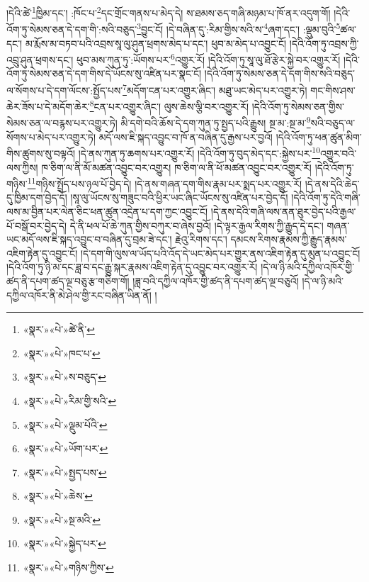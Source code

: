 །དེའི་ཚེ་\footnote{«སྣར་»«པེ་»ཚེ་ནི་}ཁྱིམ་དང་། :ཁོང་པ་\footnote{«སྣར་»«པེ་»ཁང་པ་}དང་གྲོང་གནས་པ་མེད་དེ། ས་ཐམས་ཅད་གཞི་མཉམ་པ་ཁོ་ནར་འདུག་གོ། །དེའི་འོག་ཏུ་སེམས་ཅན་དེ་དག་གི་:སའི་བཅུད་\footnote{«སྣར་»«པེ་»ས་བཅུད་}བྱུང་ངོ། །དེ་བཞིན་དུ་:རིམ་གྱིས་སའི་ས་\footnote{«སྣར་»«པེ་»རིམ་གྱི་སའི་}ཞག་དང་། :ལྡུམ་བུའི་\footnote{«སྣར་»«པེ་»ལྡུམ་པོའི་}ཚལ་དང་། མ་རྨོས་མ་བཏབ་པའི་འབྲས་སཱ་ལུ་ཤུན་ཕྲགས་མེད་པ་དང་། ཕུབ་མ་མེད་པ་འབྱུང་ངོ། །དེའི་འོག་ཏུ་འབྲས་ཀྱི་འབྲུ་ཤུན་ཕྲགས་དང་། ཕུབ་མས་ཀུན་ཏུ་:ཡོགས་པར་\footnote{«སྣར་»«པེ་»ཡོག་པར་}འགྱུར་རོ། །དེའི་འོག་ཏུ་སཱ་ལུ་ཐོ་རྩེར་སྐྱེ་བར་འགྱུར་རོ། །དེའི་འོག་ཏུ་སེམས་ཅན་དེ་དག་གིས་དེ་ཡོངས་སུ་འཛིན་པར་སྣང་ངོ། །དེའི་འོག་ཏུ་སེམས་ཅན་དེ་དག་གིས་སའི་བཅུད་ལ་སོགས་པ་དེ་དག་ལོངས་:སྤྱོད་པས་\footnote{«སྣར་»«པེ་»སྤྱད་པས་}མདོག་ངན་པར་འགྱུར་ཞིང་། མཐུ་ཡང་མེད་པར་འགྱུར་ཏེ། གང་གིས་ཤས་ཆེར་ཟོས་པ་དེ་མདོག་ཆེར་\footnote{«སྣར་»«པེ་»ཆེས་}ངན་པར་འགྱུར་ཞིང་། ལུས་ཆེས་ལྕི་བར་འགྱུར་རོ། །དེའི་འོག་ཏུ་སེམས་ཅན་གྱིས་སེམས་ཅན་ལ་བརྙས་པར་འགྱུར་ཏེ། མི་དགེ་བའི་ཆོས་དེ་དག་ཀུན་ཏུ་སྤྱད་པའི་རྒྱུས། སྔ་མ་:སྔ་མ་\footnote{«སྣར་»«པེ་»སྔ་མའི་}སའི་བཅུད་ལ་སོགས་པ་མེད་པར་འགྱུར་ཏེ། མདོ་ལས་ཇི་སྐད་འབྱུང་བ་ཁོ་ན་བཞིན་དུ་རྒྱས་པར་བྱའོ། །དེའི་འོག་ཏུ་ཕན་ཚུན་མིག་གིས་ཚུགས་སུ་བལྟའོ། །དེ་ནས་ཀུན་ཏུ་ཆགས་པར་འགྱུར་རོ། །དེའི་འོག་ཏུ་བུད་མེད་དང་:སྐྱེས་པར་\footnote{«སྣར་»«པེ་»སྐྱེད་པར་}འགྱུར་བའི་ལས་ཀྱིས། ཁ་ཅིག་ལ་ནི་མོ་མཚན་འབྱུང་བར་འགྱུར། ཁ་ཅིག་ལ་ནི་ཕོ་མཚན་འབྱུང་བར་འགྱུར་རོ། །དེའི་འོག་ཏུ་གཉིས་\footnote{«སྣར་»«པེ་»གཉིས་ཀྱིས་}གཉིས་སྤྲོད་པས་ཉལ་པོ་བྱེད་དེ། །དེ་ནས་གཞན་དག་གིས་རྣམ་པར་སྨད་པར་འགྱུར་རོ། །དེ་ནས་དེའི་ཆེད་དུ་ཁྱིམ་དག་བྱེད་དོ། །སཱ་ལུ་ཡོངས་སུ་གཟུང་བའི་ཕྱིར་ཡང་ཞིང་ཡོངས་སུ་འཛིན་པར་བྱེད་དོ། །དེའི་འོག་ཏུ་དེའི་གཞི་ལས་མ་བྱིན་པར་ལེན་ཅིང་ཕན་ཚུན་འདྲེན་པ་དག་ཀྱང་འབྱུང་ངོ། །དེ་ནས་དེའི་གཞི་ལས་ནན་ཐུར་བྱེད་པའི་རྒྱལ་པོ་བསྒོ་བར་བྱེད་དེ། དེ་ནི་ཕལ་པོ་ཆེ་ཀུན་གྱིས་བཀུར་བ་ཞེས་བྱའོ། །དེ་ལྟར་རྒྱལ་རིགས་ཀྱི་རྒྱུད་དེ་དང་། གཞན་ཡང་མདོ་ལས་ཇི་སྐད་འབྱུང་བ་བཞིན་དུ་བྲམ་ཟེ་དང་། རྗེའུ་རིགས་དང་། དམངས་རིགས་རྣམས་ཀྱི་རྒྱུད་རྣམས་འཇིག་རྟེན་དུ་འབྱུང་ངོ། །དེ་དག་གི་ལུས་ལ་ཡོད་པའི་འོད་དེ་ཡང་མེད་པར་གྱུར་ནས་འཇིག་རྟེན་དུ་མུན་པ་འབྱུང་ངོ། །དེའི་འོག་ཏུ་ཉི་མ་དང་ཟླ་བ་དང་རྒྱུ་སྐར་རྣམས་འཇིག་རྟེན་དུ་འབྱུང་བར་འགྱུར་རོ། །དེ་ལ་ཉི་མའི་དཀྱིལ་འཁོར་གྱི་ཚད་ནི་དཔག་ཚད་ལྔ་བཅུ་རྩ་གཅིག་གོ། །ཟླ་བའི་དཀྱིལ་འཁོར་གྱི་ཚད་ནི་དཔག་ཚད་ལྔ་བཅུའོ། །དེ་ལ་ཉི་མའི་དཀྱིལ་འཁོར་ནི་མེ་ཤེལ་གྱི་རང་བཞིན་ཡིན་ནོ། །
